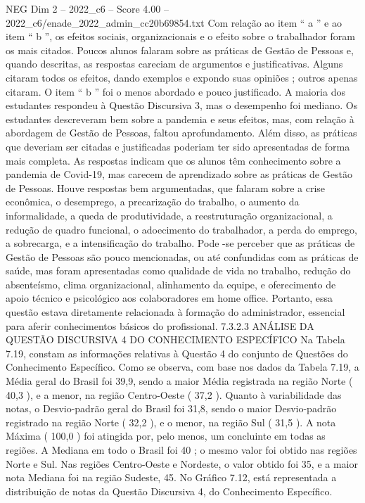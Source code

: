 \begin{textsample}{NEG Dim 2 – 2022\_c6 – Score 4.00 – 2022\_c6/enade\_2022\_admin\_cc20b69854.txt}
Com relação ao item “ a ” e ao item “ b ”, os efeitos sociais, organizacionais e o efeito sobre o trabalhador foram os mais citados.
Poucos alunos falaram sobre as práticas de Gestão de Pessoas e, quando descritas, as respostas careciam de argumentos e justificativas.
Alguns citaram todos os efeitos, dando exemplos e expondo suas opiniões ; outros apenas citaram.
O item “ b ” foi o menos abordado e pouco justificado.
A maioria dos estudantes respondeu à Questão Discursiva 3, mas o desempenho foi mediano.
Os estudantes descreveram bem sobre a pandemia e seus efeitos, mas, com relação à abordagem de Gestão de Pessoas, faltou aprofundamento.
Além disso, as práticas que deveriam ser citadas e justificadas poderiam ter sido apresentadas de forma mais completa.
As respostas indicam que os alunos têm conhecimento sobre a pandemia de Covid-19, mas carecem de aprendizado sobre as práticas de Gestão de Pessoas.
Houve respostas bem argumentadas, que falaram sobre a crise econômica, o desemprego, a precarização do trabalho, o aumento da informalidade, a queda de produtividade, a reestruturação organizacional, a redução de quadro funcional, o adoecimento do trabalhador, a perda do emprego, a sobrecarga, e a intensificação do trabalho.
Pode -se perceber que as práticas de Gestão de Pessoas são pouco mencionadas, ou até confundidas com as práticas de saúde, mas foram apresentadas como qualidade de vida no trabalho, redução do absenteísmo, clima organizacional, alinhamento da equipe, e oferecimento de apoio técnico e psicológico aos colaboradores em home office.
Portanto, essa questão estava diretamente relacionada à formação do administrador, essencial para aferir conhecimentos básicos do profissional. 7.3.2.3 ANÁLISE DA QUESTÃO DISCURSIVA 4 DO CONHECIMENTO ESPECÍFICO Na Tabela 7.19, constam as informações relativas à Questão 4 do conjunto de Questões do Conhecimento Específico.
Como se observa, com base nos dados da Tabela 7.19, a Média geral do Brasil foi 39,9, sendo a maior Média registrada na região Norte ( 40,3 ), e a menor, na região Centro-Oeste ( 37,2 ).
Quanto à variabilidade das notas, o Desvio-padrão geral do Brasil foi 31,8, sendo o maior Desvio-padrão registrado na região Norte ( 32,2 ), e o menor, na região Sul ( 31,5 ).
A nota Máxima ( 100,0 ) foi atingida por, pelo menos, um concluinte em todas as regiões.
A Mediana em todo o Brasil foi 40 ; o mesmo valor foi obtido nas regiões Norte e Sul.
Nas regiões Centro-Oeste e Nordeste, o valor obtido foi 35, e a maior nota Mediana foi na região Sudeste, 45.
No Gráfico 7.12, está representada a distribuição de notas da Questão Discursiva 4, do Conhecimento Específico.

\end{textsample}

